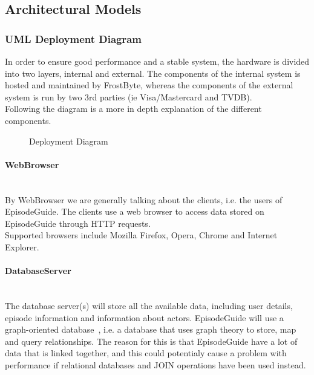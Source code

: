 \subsection{Architectural Models}
\subsubsection{UML Deployment Diagram}
In order to ensure good performance and a stable system, the hardware is divided into two layers, internal and external.
The components of the internal system is hosted and maintained by FrostByte, whereas the components of the external system is run by two 3rd parties (ie Visa/Mastercard and TVDB).
\\
Following the diagram is a more in depth explanation of the different components.
\begin{figure}[H]
\caption{Deployment Diagram}
\end{figure}

\paragraph*{WebBrowser}~\\
By WebBrowser we are generally talking about the clients, i.e. the users of EpisodeGuide. The clients use a web browser to access data stored on EpisodeGuide through HTTP requests.\\
Supported browsers include Mozilla Firefox, Opera, Chrome and Internet Explorer.

\paragraph*{DatabaseServer}~\\
The database server(s) will store all the available data, including user details, episode information and information about actors. EpisodeGuide will use a graph-oriented database~\cite{website:graphdb}, i.e. a database that uses graph theory to store, map and query relationships. The reason for this is that EpisodeGuide have a lot of data that is linked together, and this could potentialy cause a problem with performance if relational databases and JOIN operations have been used instead.

